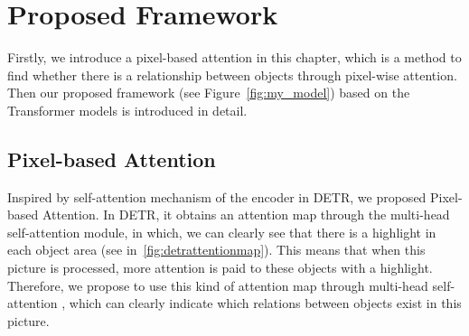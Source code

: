 \chapter{Proposed Framework}
\label{chap:framework}
Firstly, we introduce a pixel-based attention in this chapter, which is a method to find whether there is a relationship between objects through pixel-wise attention. Then our proposed framework (see Figure~\ref{fig:my_model}) based on the Transformer models is introduced in detail.


\section{Pixel-based Attention}\label{sec:pixel_base}

Inspired by self-attention mechanism of the encoder in DETR, we proposed Pixel-based Attention. In DETR, it obtains an attention map through the multi-head self-attention module, in which, we can clearly see that there is a highlight in each object area (see in~\ref{fig:detrattentionmap}). This means that when this picture is processed, more attention is paid to these objects with a highlight. Therefore, we propose to use this kind of attention map through multi-head self-attention , which can clearly indicate which relations between objects exist in this picture.

